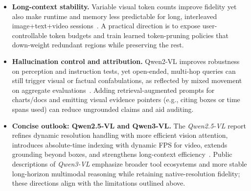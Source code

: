 \begin{enrichment}
\begin{enrichment}
\begin{itemize}
            \item \textbf{Long\mbox{-}context stability.} Variable visual token counts improve fidelity yet also make runtime and memory less predictable for long, interleaved image\mbox{+}text\mbox{+}video sessions~\cite[Table~7; Fig.\,``Accuracy vs.\ Inference Sequence Length'']{wang2024_qwen2vl}. A practical direction is to expose user\mbox{-}controllable token budgets and train learned token\mbox{-}pruning policies that down\mbox{-}weight redundant regions while preserving the rest. 
            
            \item \textbf{Hallucination control and attribution.} Qwen2\mbox{-}VL improves robustness on perception and instruction tests, yet open\mbox{-}ended, multi\mbox{-}hop queries can still trigger visual or factual confabulations, as reflected by mixed movement on aggregate evaluations~\cite[Table~2]{wang2024_qwen2vl}. Adding retrieval\mbox{-}augmented prompts for charts/docs and emitting visual evidence pointers (e.g., citing boxes or time spans used) can reduce ungrounded claims and aid auditing.
        
            \item \textbf{Concise outlook: Qwen2.5\mbox{-}VL and Qwen3\mbox{-}VL.} The \emph{Qwen2.5\mbox{-}VL} report refines dynamic resolution handling with more efficient vision attention, introduces absolute\mbox{-}time indexing with dynamic FPS for video, extends grounding beyond boxes, and strengthens long\mbox{-}context efficiency~\cite{qwen2025_qwen25technicalreport}. Public descriptions of \emph{Qwen3\mbox{-}VL} emphasize broader tool ecosystems and more stable long\mbox{-}horizon multimodal reasoning while retaining native\mbox{-}resolution fidelity; these directions align with the limitations outlined above.
        \end{itemize}
        
    \end{enrichment}
    
\end{enrichment}

\newpage

